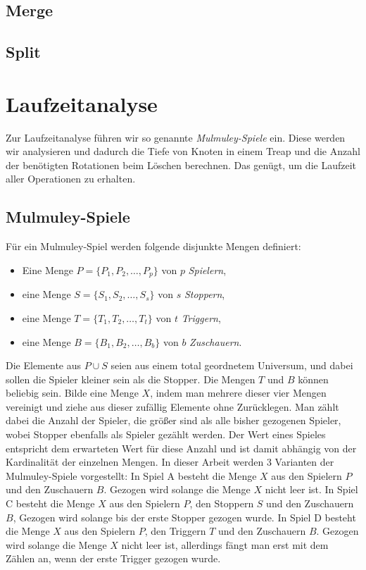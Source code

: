 \documentclass[a4paper]{scrreprt}
\theoremstyle{definition}
\begin{document}
\subsection{Merge}
\label{sec:merge}

\subsection{Split}
\label{sec:split}

\section{Laufzeitanalyse}
\label{sec:runtime}
Zur Laufzeitanalyse führen wir so genannte \emph{Mulmuley-Spiele} ein.
Diese werden wir analysieren und dadurch die Tiefe von Knoten in einem Treap und die Anzahl der benötigten Rotationen beim Löschen berechnen.
Das genügt, um die Laufzeit aller Operationen zu erhalten.

\subsection{Mulmuley-Spiele}
\label{sec:mulmuley}
Für ein Mulmuley-Spiel werden folgende disjunkte Mengen definiert: %
\begin{itemize}
    \item Eine Menge $P = \{P_1, P_2, \dots, P_p\}$ von $p$ \emph{Spielern},
    \item eine Menge $S = \{S_1, S_2, \dots, S_s\}$ von $s$ \emph{Stoppern},
    \item eine Menge $T = \{T_1, T_2, \dots, T_t\}$ von $t$ \emph{Triggern},
    \item eine Menge $B = \{B_1, B_2, \dots, B_b\}$ von $b$ \emph{Zuschauern}.
\end{itemize}
Die Elemente aus $P \cup S$ seien aus einem total geordnetem Universum, und dabei sollen die Spieler kleiner sein als die Stopper.
Die Mengen $T$ und $B$ können beliebig sein.
Bilde eine Menge $X$, indem man mehrere dieser vier Mengen vereinigt und ziehe aus dieser zufällig Elemente ohne Zurücklegen.
Man zählt dabei die Anzahl der Spieler, die größer sind als alle bisher gezogenen Spieler, wobei Stopper ebenfalls als Spieler gezählt werden.
Der Wert eines Spieles entspricht dem erwarteten Wert für diese Anzahl und ist damit abhängig von der Kardinalität der einzelnen Mengen.
In dieser Arbeit werden 3 Varianten der Mulmuley-Spiele vorgestellt:
In Spiel A besteht die Menge $X$ aus den Spielern $P$ und den Zuschauern $B$.
Gezogen wird solange die Menge $X$ nicht leer ist.
In Spiel C besteht die Menge $X$ aus den Spielern $P$, den Stoppern $S$ und den Zuschauern $B$,
Gezogen wird solange bis der erste Stopper gezogen wurde.
In Spiel D besteht die Menge $X$ aus den Spielern $P$, den Triggern $T$ und den Zuschauern $B$.
Gezogen wird solange die Menge $X$ nicht leer ist, allerdings fängt man erst mit dem Zählen an, wenn der erste Trigger gezogen wurde.
\end{document}

